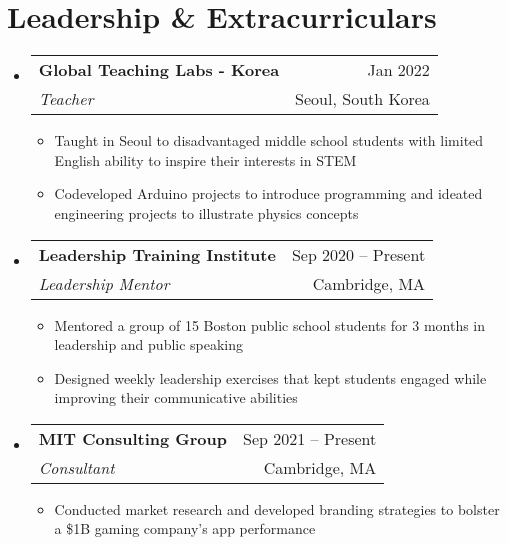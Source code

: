 \documentclass[letterpaper,11pt]{article}
\makeatletter
\newcommand{\resumeItem}[1]{
  \item\small{
    {#1 \vspace{-2pt}}
  }
}
\newcommand{\resumeSubheading}[4]{
  \vspace{-2pt}\item
    \begin{tabular*}{1.0\textwidth}[t]{l@{\extracolsep{\fill}}r}
      \textbf{#1} & {\small #2} \\
      \textit{\small#3} & {\small #4} \\
    \end{tabular*}\vspace{-7pt}
}
\newcommand{\resumeSubHeadingListStart}{\begin{itemize}[leftmargin=0.0in, label={}]}
\newcommand{\resumeSubHeadingListEnd}{\end{itemize}}
\newcommand{\resumeItemListStart}{\begin{itemize}}
\newcommand{\resumeItemListEnd}{\end{itemize}\vspace{-5pt}}
\makeatother
\begin{document}
\vspace{-16pt}

\section{Leadership \& Extracurriculars}
  \resumeSubHeadingListStart
  
    \resumeSubheading
      {Global Teaching Labs - Korea}{Jan 2022}
      {Teacher}{Seoul, South Korea}
      \resumeItemListStart
        \resumeItem{Taught in Seoul to disadvantaged middle school students with limited English ability to inspire their interests in STEM}
        \resumeItem{Codeveloped Arduino projects to introduce programming and ideated engineering projects to illustrate physics concepts}
      \resumeItemListEnd

  \resumeSubHeadingListEnd
\vspace{-12pt}
  \resumeSubHeadingListStart
  
    \resumeSubheading
      {Leadership Training Institute}{Sep 2020 -- Present}
      {Leadership Mentor}{Cambridge, MA}
      \resumeItemListStart
        \resumeItem{Mentored a group of 15 Boston public school students for 3 months in leadership and public speaking}
        \resumeItem{Designed weekly leadership exercises that kept students engaged while improving their communicative abilities}
      \resumeItemListEnd

  \resumeSubHeadingListEnd
  
\vspace{-12pt}
  \resumeSubHeadingListStart
  
    \resumeSubheading
      {MIT Consulting Group}{Sep 2021 -- Present}
      {Consultant}{Cambridge, MA}
      \resumeItemListStart
        \resumeItem{Conducted market research and developed branding strategies to bolster a \$1B gaming company's app performance}


      \resumeItemListEnd

  \resumeSubHeadingListEnd
\vspace{-16pt}





\end{document}
